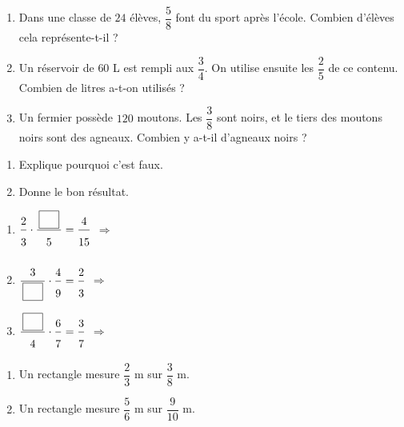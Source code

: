 \bigskip
{}
 
\begin{enumerate}[leftmargin=*,align=parleft, label=\alph*), itemsep=9pt]
\item Dans une classe de $24$ élèves, $\dfrac{5}{8}$ font du sport après l'école. Combien d'élèves cela représente-t-il ?
\item Un réservoir de $60$ L est rempli aux $\dfrac{3}{4}$. On utilise ensuite les $\dfrac{2}{5}$ de ce contenu. Combien de litres a-t-on utilisés ?
\item Un fermier possède $120$ moutons. Les $\dfrac{3}{8}$ sont noirs, et le tiers des moutons noirs sont des agneaux. Combien y a-t-il d'agneaux noirs ?
\end{enumerate}
 
\bigskip
{}
 
\begin{enumerate}[leftmargin=*,align=parleft, label=\alph*), itemsep=9pt]
\item Explique pourquoi c'est faux.
\item Donne le bon résultat.
\end{enumerate}
 
\bigskip
{}
 
\begin{enumerate}[leftmargin=*,align=parleft, label=\alph*), itemsep=9pt]
\item $\FA{2}{3}\cdot\FA{\CaseC}{5}=\FA{4}{15}$ \quad $\Longrightarrow$
\item $\FA{3}{\CaseC}\cdot\FA{4}{9}=\FA{2}{3}$ \quad $\Longrightarrow$
\item $\FA{\CaseC}{4}\cdot\FA{6}{7}=\FA{3}{7}$ \quad $\Longrightarrow$
\end{enumerate}
 
\bigskip
{}
 
\begin{enumerate}[leftmargin=*,align=parleft, label=\alph*), itemsep=9pt]
\item Un rectangle mesure $\dfrac{2}{3}$ m sur $\dfrac{3}{8}$ m.
\item Un rectangle mesure $\dfrac{5}{6}$ m sur $\dfrac{9}{10}$ m.
\end{enumerate}
 
\bigskip
{}
 
